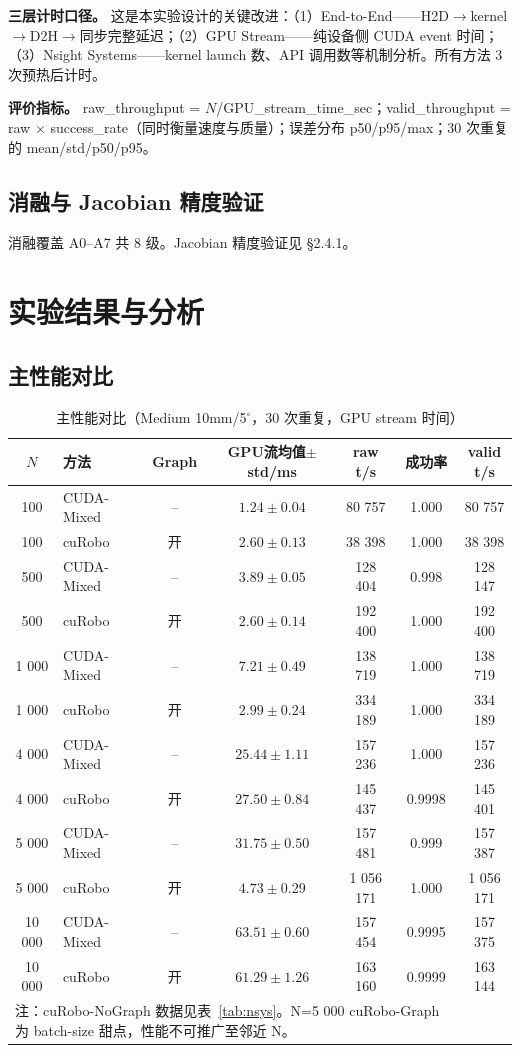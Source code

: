 \documentclass[twocolumn,a4paper,10pt]{ctexart}
\begin{document}
{\bfseries 三层计时口径。} 这是本实验设计的关键改进：（1）End-to-End——H2D$\to$kernel$\to$D2H$\to$同步完整延迟；（2）GPU Stream——纯设备侧 CUDA event 时间；（3）Nsight Systems——kernel launch 数、API 调用数等机制分析。所有方法 3 次预热后计时。

{\bfseries 评价指标。} raw\_throughput = $N$/GPU\_stream\_time\_sec；valid\_throughput = raw $\times$ success\_rate（同时衡量速度与质量）；误差分布 p50/p95/max；30 次重复的 mean/std/p50/p95。

\subsection{消融与 Jacobian 精度验证}

消融覆盖 A0--A7 共 8 级。Jacobian 精度验证见 §2.4.1。

\section{实验结果与分析}\label{sec:results}

\subsection{主性能对比}

\begin{table}[ht]
\centering\small
\caption{主性能对比（Medium 10mm/5$^\circ$，30 次重复，GPU stream 时间）}
\label{tab:maincomp}
\begin{tabular}{clccccc}
\toprule
$N$ & 方法 & Graph & GPU流均值$\pm$std/ms & raw t/s & 成功率 & valid t/s \\
\midrule
100 & CUDA-Mixed & -- & $1.24\pm0.04$ & 80 757 & 1.000 & 80 757 \\
100 & cuRobo & 开 & $2.60\pm0.13$ & 38 398 & 1.000 & 38 398 \\
\midrule
500 & CUDA-Mixed & -- & $3.89\pm0.05$ & 128 404 & 0.998 & 128 147 \\
500 & cuRobo & 开 & $2.60\pm0.14$ & 192 400 & 1.000 & 192 400 \\
\midrule
1 000 & CUDA-Mixed & -- & $7.21\pm0.49$ & 138 719 & 1.000 & 138 719 \\
1 000 & cuRobo & 开 & $2.99\pm0.24$ & 334 189 & 1.000 & 334 189 \\
\midrule
4 000 & CUDA-Mixed & -- & $25.44\pm1.11$ & 157 236 & 1.000 & 157 236 \\
4 000 & cuRobo & 开 & $27.50\pm0.84$ & 145 437 & 0.9998 & 145 401 \\
\midrule
5 000 & CUDA-Mixed & -- & $31.75\pm0.50$ & 157 481 & 0.999 & 157 387 \\
5 000 & cuRobo & 开 & $4.73\pm0.29$ & 1 056 171 & 1.000 & 1 056 171 \\
\midrule
10 000 & CUDA-Mixed & -- & $63.51\pm0.60$ & 157 454 & 0.9995 & 157 375 \\
10 000 & cuRobo & 开 & $61.29\pm1.26$ & 163 160 & 0.9999 & 163 144 \\
\bottomrule
\multicolumn{6}{l}{\footnotesize 注：cuRobo-NoGraph 数据见表~\ref{tab:nsys}。N=5 000 cuRobo-Graph 为 batch-size 甜点，性能不可推广至邻近 N。} \\
\end{tabular}
\end{table}
\end{document}
